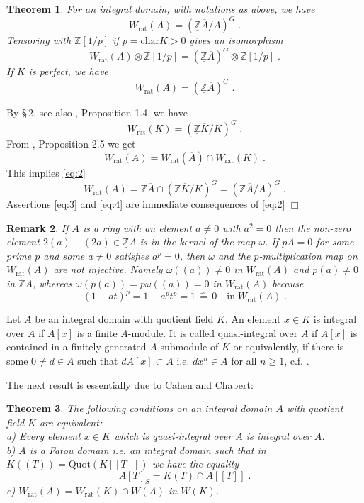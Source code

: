 \documentclass[12pt,leqno]{article}
\newcommand{\Z}{{\mathbb{Z}}}
\newcommand{\uZ}{\underline{\Z}}
\newcommand{\car}{\mathrm{char}}
\newcommand{\rat}{\mathrm{rat}}
\newcommand{\onA}{\overline{A}}
\newcommand{\oK}{\overline{K}}
\newcommand{\ent}{\,\hat{=}\,}
\newtheorem{theorem}{Theorem}[section]
\newtheorem{remark}[theorem]{Remark}
\newenvironment{proof}{\noindent {\bf Proof}}{\mbox{}\hspace*{\fill}$\Box$}
\newcommand{\Quot}{\mathrm{Quot}}
\begin{document}
\begin{theorem}
\label{t1.1}
For an integral domain, with notations as above, we have
\begin{equation}
\label{eq:2}
W_{\rat} (A) = (\uZ \onA / A)^G \; .
\end{equation}
Tensoring with $\Z [1 / p]$ if $p = \car K > 0$ gives an isomorphism
\begin{equation}
\label{eq:3}
W_{\rat} (A) \otimes \Z [1 / p] = (\uZ \onA)^G \otimes \Z [ 1/p ] \; .
\end{equation}
If $K$ is perfect, we have
\begin{equation}
\label{eq:4}
W_{\rat} (A) = (\uZ \onA)^G \; .
\end{equation}
\end{theorem}

\begin{proof}
By \cite{BV} \S\,2, see also \cite{D}, Proposition 1.4, we have
\[
W_{\rat} (K) = (\uZ \oK / K)^G \; .
\]
From \cite{CC}, Proposition 2.5 we get
\[
W_{\rat} (A) = W_{\rat} (\onA) \cap W_{\rat} (K) \; .
\]
This implies \eqref{eq:2}
\[
W_{\rat} (A) = \uZ \onA \cap (\uZ \oK / K)^G = (\uZ \onA / A)^G \; .
\]
Assertions \eqref{eq:3} and \eqref{eq:4} are immediate consequences of \eqref{eq:2}
\end{proof}

\begin{remark}
\label{t1.2}
\em If $A$ is a ring with an element $a \neq 0$ with $a^2 = 0$ then the non-zero element $2 (a) - (2a) \in \uZ A$ is in the kernel of the map $\omega$. If $pA = 0$ for some prime $p$ and some $a \neq 0$ satisfies $a^p = 0$, then $\omega$ and the $p$-multiplication map on $W_{\rat} (A)$ are not injective. Namely $\omega ((a)) \neq 0$ in $W_{\rat} (A)$ and $p (a) \neq 0$ in $\uZ A$, whereas $\omega (p (a)) = p \omega ((a)) = 0$ in $W_{\rat} (A)$ because
\[
(1 - at)^p = 1 - a^p t^p = 1 \ent 0 \quad \text{in} \; W_{\rat} (A) \; .
\]
\end{remark}

Let $A$ be an integral domain with quotient field $K$. An element $x \in K$ is integral over $A$ if $A [x]$ is a finite $A$-module. It is called quasi-integral over $A$ if $A [x]$ is contained in a finitely generated $A$-submodule of $K$ or equivalently, if there is some $0 \neq d \in A$ such that $dA [x] \subset A$ i.e. $dx^n \in A$ for all $n \ge 1$, c.f. \cite{K}.

The next result is essentially due to Cahen and Chabert:

\begin{theorem}
\label{t1.3}
The following conditions on an integral domain $A$ with quotient field $K$ are equivalent:\\
a) Every element $x \in K$ which is quasi-integral over $A$ is integral over $A$.\\
b) $A$ is a Fatou domain i.e. an integral domain such that in $K ((T)) = \Quot (K [[T]])$ we have the equality
\[
A [T]_S = K (T) \cap A [[T]] \; .
\]
c) $W_{\rat} (A) = W_{\rat} (K) \cap W (A)$ in $W (K)$. 
\end{theorem}
\end{document}
